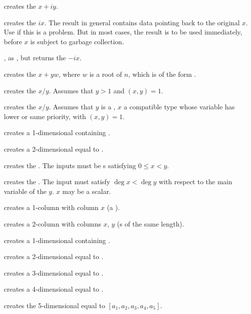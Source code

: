  creates the  $x + iy$.

 creates the  $ix$. The result in
general contains data pointing back to the original $x$. Use  if
this is a problem. But in most cases, the result is to be used immediately,
before $x$ is subject to garbage collection.

, as , but returns the 
$-ix$.

 creates the  $x + yw$,
where $w$ is a root of $n$, which is of the form .

 creates the  $x/y$. Assumes that
$y > 1$ and $(x,y) = 1$.

 creates the  $x/y$. Assumes
that $y$ is a , $x$ a compatible type whose variable has lower
or same priority, with $(x,y) = 1$.

 creates a 1-dimensional  containing .

 creates a 2-dimensional  equal to
\kbd{[x,y]}.

 creates the  .
The inputs must be s satisfying $0 \leq x < y$.

 creates the  .
The input must satisfy $\deg x < \deg y$ with respect to the main variable of
the  $y$. $x$ may be a scalar.

 creates a 1-column  with column $x$
(a ).

 creates a 2-column  with columns
$x$, $y$ (s of the same length).

 creates a 1-dimensional  containing .

 creates a 2-dimensional  equal to
\kbd{[x,y]}.

 creates a 3-dimensional 
equal to \kbd{[x,y,z]}.

 creates a 4-dimensional 
equal to \kbd{[x,y,z,t]}.

 creates the
5-dimensional  equal to $[a_1,a_2,a_3,a_4,a_5]$.

